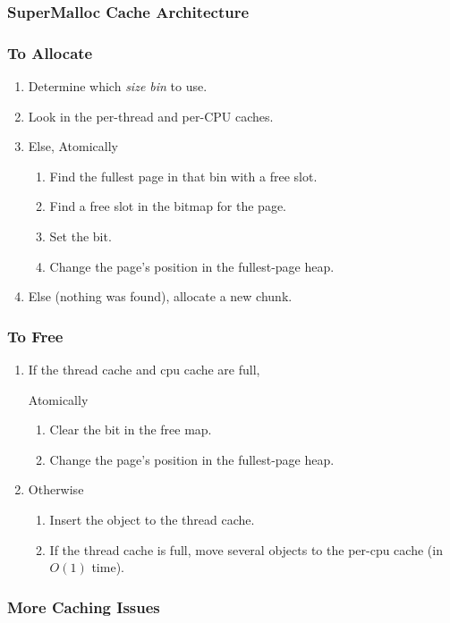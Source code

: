 \documentclass[xcolor=dvipsnames,14pt]{beamer}
\newcommand{\smmpunt}[1]{#1}
\begin{document}
\begin{frame}
\frametitle{SuperMalloc Cache Architecture}

\end{frame}

\begin{frame}
\frametitle{To Allocate}


\begin{enumerate}
\item Determine which \textit{size bin} to use.
\item Look in the per-thread and per-CPU caches.
\item Else, Atomically 
  \begin{enumerate}
  \item Find the fullest page in that bin with a free slot.
  \item Find a free slot in the bitmap for the page.
  \item Set the bit.
  \item Change the page's position in the fullest-page heap.
  \end{enumerate}
\item Else (nothing was found), allocate a new chunk.
\end{enumerate}
\end{frame}

\begin{frame}
\frametitle{To Free}
\begin{enumerate}
\item If the thread cache and cpu cache are full, 

 Atomically
 \begin{enumerate}
 \item Clear the bit in the free map.
 \item Change the page's position in the fullest-page heap.
 \end{enumerate}
\item Otherwise 
 \begin{enumerate}
 \item Insert the object to the thread cache.
 \item If the thread cache is full, move several objects to the per-cpu cache (in $O(1)$ time).
 \end{enumerate}
\end{enumerate}
\end{frame}

\smmpunt{
\begin{frame}
\frametitle{More Caching Issues}
\end{frame}
}
\end{document}
